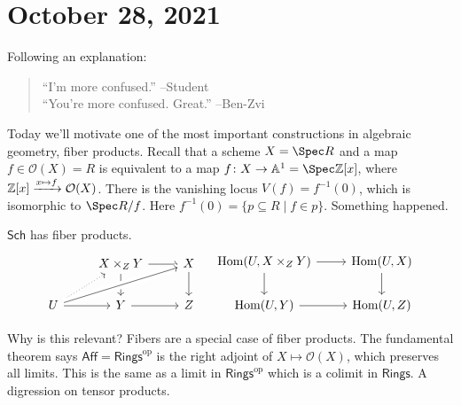 \section{October 28, 2021} 
Following an explanation:
\begin{quotation}
``I'm more confused.'' --Student\\
``You're more confused. Great.'' --Ben-Zvi
\end{quotation}
Today we'll motivate one of the most important constructions in algebraic geometry, fiber products. Recall that a scheme $X=\Spec R$ and a map $f \in \mathcal{O} (X)=R$ is equivalent to a map $f \colon X \to \A^1 = \Spec \Z[x]$, where $\mathbb{Z}[x] \xrightarrow{ x \mapsto  f} \mathcal{O} (X)$. There is the vanishing locus $V(f)= f ^{-1}(0)$, which is isomorphic to $\Spec R /f$. Here $f ^{-1} (0) = \{p \subseteq  R \mid  f \in p\} $. Something happened.
\begin{theorem}
    $\mathsf{Sch} $ has fiber products. \[
        \begin{tikzcd}
                                           & X\times_ZY \arrow[r] \arrow[d] & X \arrow[d] \\
U \arrow[ru, dotted] \arrow[rru, crossing over] \arrow[r] & Y \arrow[r]                    & Z          
\end{tikzcd}\quad
\begin{tikzcd}
{\Hom(U,X\times_ZY)} \arrow[r] \arrow[d] & {\Hom(U,X)} \arrow[d] \\
{\Hom(U,Y)} \arrow[r]                    & {\Hom(U,Z)}          
\end{tikzcd}
    \] 
\end{theorem}
Why is this relevant? Fibers are a special case of fiber products. The fundamental theorem says $\mathsf{Aff} =\mathsf{Rings} ^{\mathrm{op}}$ is the right adjoint of $X \mapsto  \mathcal{O} (X)$, which preserves all limits. This is the same as a limit in $\mathsf{Rings} ^{\mathrm{op}}$ which is a colimit in $\mathsf{Rings} $. A digression on tensor products.

